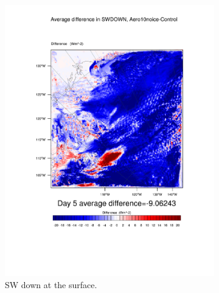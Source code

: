 \begin{figure}
\centering
	\begin{subfigure}{0.48\textwidth}
		\includegraphics[width=\textwidth]{results/aero10ni/diff_Aero10NoIce_SWDOWN_Day5.pdf}
		\caption{SW down at the surface.}
		\label{subfig:swdown_r4Day5}
	\end{subfigure}
	\quad
	\begin{subfigure}{0.48\textwidth}
		\centering

\end{subfigure}
\end{figure}
